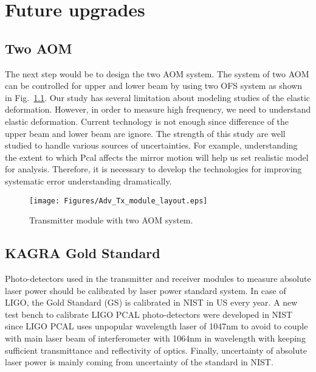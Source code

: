 
\chapter{Future upgrades} %

\label{Chapter7} %
\section{Two AOM}
The next step would be to design the two AOM system. The system of two AOM can be controlled for upper and lower beam by using two OFS system as shown in Fig.~\ref{fig:Adv_Tx_module_layout}. Our study has several limitation about modeling studies of the elastic deformation. However, in order to measure high frequency, we need to understand elastic deformation.
Current technology is not enough since difference of the upper beam and lower beam are ignore. The strength of this study are well studied to handle various sources of uncertainties. For example, understanding the extent to which Pcal affects the mirror motion will help us set realistic model for analysis. Therefore, it is necessary to develop the technologies for improving systematic error understanding dramatically.
\begin{figure}
\begin{center}
\texttt{[image: Figures/Adv\_Tx\_module\_layout.eps]}
\caption{Transmitter module with two AOM system.} 
\label{fig:Adv_Tx_module_layout} 
\end{center}
\end{figure}

\section{KAGRA Gold Standard}
Photo-detectors used in the transmitter and receiver modules to measure absolute laser power should be calibrated by laser power standard system. In case of LIGO, the Gold Standard (GS) is calibrated in NIST in US every year. A new test bench to calibrate LIGO PCAL photo-detectors were developed in NIST since LIGO PCAL uses unpopular wavelength laser of 1047nm to avoid to couple with main laser beam of interferometer with 1064nm in wavelength with keeping sufficient transmittance and reflectivity of optics. Finally, uncertainty of absolute laser power is mainly coming from uncertainty of the standard in NIST. 

